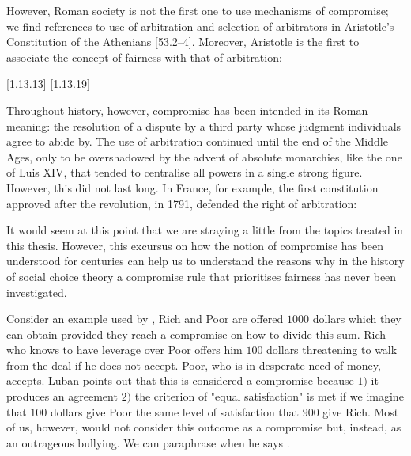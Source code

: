 However, Roman society is not the first one to use mechanisms of compromise; we find references to use of arbitration and selection of arbitrators in Aristotle’s Constitution of the Athenians [53.2–4]. %
Moreover, Aristotle is the first to associate the concept of fairness with that of arbitration:
%
\begin{displayquote}
\textit{}\citet{OnRhetoric}[1.13.13]
\textit{}\citet{OnRhetoric}[1.13.19]
\end{displayquote}
%
Throughout history, however, compromise has been intended in its Roman meaning: the resolution of a dispute by a third party whose judgment individuals agree to abide by.
The use of arbitration continued until the end of the Middle Ages, only to be overshadowed by the advent of absolute monarchies, like the one of Luis XIV, that tended to centralise all powers in a single strong figure.\citep{Zappala2018}
However, this did not last long. In France, for example, the first constitution approved after the revolution, in 1791, defended the right of arbitration:
%
\begin{displayquote}
\textit{}\citep{Constitution1791}
\end{displayquote}
%
It would seem at this point that we are straying a little from the topics treated in this thesis. However, this excursus on how the notion of compromise has been understood for centuries can help us to understand the reasons why in the history of social choice theory a compromise rule that prioritises fairness has never been investigated.

Consider an example used by \cite{Luban1985}, Rich and Poor are offered $1000$ dollars which they can obtain provided they reach a compromise on how to divide this sum. 
Rich who knows to have leverage over Poor offers him $100$ dollars threatening to walk from the deal if he does not accept. Poor, who is in desperate need of money, accepts.
Luban points out that this is considered a compromise because $1)$ it produces an agreement $2)$ the criterion of "equal satisfaction" is met if we imagine that $100$ dollars give Poor the same level of satisfaction that $900$ give Rich. Most of us, however, would not consider this outcome as a compromise but, instead, as an outrageous bullying. We can paraphrase \citet{Braybrooke1982} when he says .

